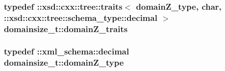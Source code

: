 \hypertarget{classdomainsize__t_aaa8ff3c9add78b2aa36254ba82bf137e}{
\subsubsection[{domain\-Z\-\_\-traits}]{\setlength{\rightskip}{0pt plus 5cm}typedef \-::xsd\-::cxx\-::tree\-::traits$<$ {\bf domain\-Z\-\_\-type}, char, \-::xsd\-::cxx\-::tree\-::schema\-\_\-type\-::decimal $>$ {\bf domainsize\-\_\-t\-::domain\-Z\-\_\-traits}}}\label{classdomainsize__t_aaa8ff3c9add78b2aa36254ba82bf137e}
\hypertarget{classdomainsize__t_ab33974c39e210e214cc02d863326cf5c}{
\subsubsection[{domain\-Z\-\_\-type}]{\setlength{\rightskip}{0pt plus 5cm}typedef \-::{\bf xml\-\_\-schema\-::decimal} {\bf domainsize\-\_\-t\-::domain\-Z\-\_\-type}}}\label{classdomainsize__t_ab33974c39e210e214cc02d863326cf5c}


